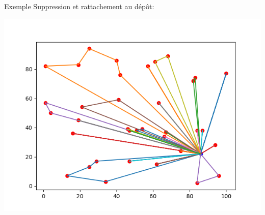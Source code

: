 \documentclass{beamer}
\begin{document}
\begin{frame}{Exemple}
Suppression et rattachement au dépôt:
\begin{center}
\includegraphics[scale=0.25]{reconstruction.png}
\end{center}
\end{frame}
\end{document}
